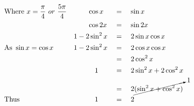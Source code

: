 \begin{alignat*}{3}
&\mathrm{Where}~x=\frac{\pi}{4}~or~\frac{5\pi}{4}&&\qquad\cos{x}&&=\quad\sin{x}\\
&\,&&\qquad\cos{2x}&&=\quad\sin{2x}\\
&\,&&1-2\sin^2{x}&&=\quad2\sin{x}\cos{x}\\
&\mathrm{As}~\sin{x}=\cos{x}\quad&&1-2\sin^2{x}&&=\quad2\cos{x}\cos{x}\\
&\,&&\,&&=\quad2\cos^2{x}\\
&\,&&\qquad\quad1&&=\quad2\sin^2{x}+2\cos^2{x}\\
&\,&&\,&&=\quad2\cancelto{1}{(\sin^2{x+\cos^2{x}})}\\
&\mathrm{Thus}&&\qquad\quad1&&=\quad2
\end{alignat*}
